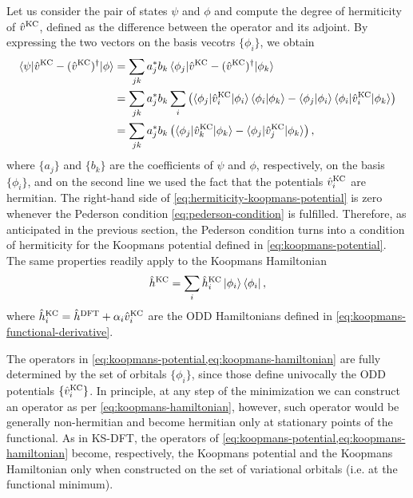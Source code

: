 Let us consider the pair of states $\psi$ and $\phi$ and compute the degree of hermiticity of $\hat{v}^{\rm KC}$, defined as the difference between the operator and its adjoint. By expressing the two vectors on the basis vecotrs $\{ \phi_i \}$, we obtain
%
\begin{equation}
    \begin{split}
    \braket{\psi|\hat{v}^{\rm KC} - (\hat{v}^{\rm KC})^{\dagger}|\phi} &= \sum_{jk} a_j^* b_k \braket{\phi_j|\hat{v}^{\rm KC} - (\hat{v}^{\rm KC})^{\dagger}|\phi_k} \\
    &= \sum_{jk} a_j^* b_k \sum_i \left( \braket{\phi_j|\hat{v}_i^{\rm KC}|\phi_i}\braket{\phi_i|\phi_k} - \braket{\phi_j|\phi_i}\braket{\phi_i|\hat{v}_i^{\rm KC}|\phi_k} \right) \\
    &= \sum_{jk} a_j^* b_k \left( \braket{\phi_j|\hat{v}_k^{\rm KC}|\phi_k} - \braket{\phi_j|\hat{v}_j^{\rm KC}|\phi_k} \right) ,
    \end{split}
    \label{eq:hermiticity-koopmans-potential}
\end{equation}
%
where $\{ a_j \}$ and $\{ b_k \}$ are the coefficients of $\psi$ and $\phi$, respectively, on the basis $\{ \phi_i \}$, and on the second line we used the fact that the potentials $\hat{v}_i^{\rm KC}$ are hermitian. The right-hand side of \cref{eq:hermiticity-koopmans-potential} is zero whenever the Pederson condition \eqref{eq:pederson-condition} is fulfilled. Therefore, as anticipated in the previous section, the Pederson condition turns into a condition of hermiticity for the Koopmans potential defined in \cref{eq:koopmans-potential}. The same properties readily apply to the Koopmans Hamiltonian
%
\begin{equation}
    \hat{h}^{\rm KC} = \sum_i \hat{h}_i^{\rm KC} \ket{\phi_i} \bra{\phi_i} ,
    \label{eq:koopmans-hamiltonian}
\end{equation}
%
where $\hat{h}_i^{\rm KC} = \hat{h}^{\rm DFT} + \alpha_i \hat{v}_i^{\rm KC}$ are the ODD Hamiltonians defined in \cref{eq:koopmans-functional-derivative}.

The operators in \cref{eq:koopmans-potential,eq:koopmans-hamiltonian} are fully determined by the set of orbitals $\{ \phi_i \}$, since those define univocally the ODD potentials $\{ \hat{v}_i^{\rm KC} \}$. In principle, at any step of the minimization we can construct an operator as per \cref{eq:koopmans-hamiltonian}, however, such operator would be generally non-hermitian and become hermitian only at stationary points of the functional. As in KS-DFT, the operators of \cref{eq:koopmans-potential,eq:koopmans-hamiltonian} become, respectively, the Koopmans potential and the Koopmans Hamiltonian only when constructed on the set of variational orbitals (i.e. at the functional minimum).

